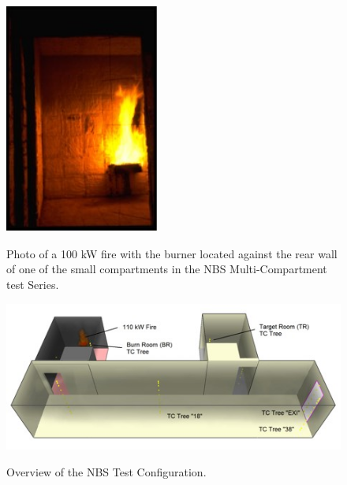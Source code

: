\begin{figure}
\begin{center}
\includegraphics[width=2.0in]{FIGURES/NBS/NBS_100kW_fire}  \\
\end{center}
\caption{Photo of a 100 kW fire with the burner located against the rear wall of one of the small compartments in the NBS Multi-Compartment test Series.}
 \label{fig:NBS_100kW_fire}
\end{figure}

\begin{figure}[\figoptions{t}]
\begin{center}
\includegraphics[width=5.0in]{FIGURES/NBS/NBS_Summary}\\
\end{center}
\caption{Overview of the NBS Test Configuration.}
 \label{fig:NBS_Summary}
\end{figure}

